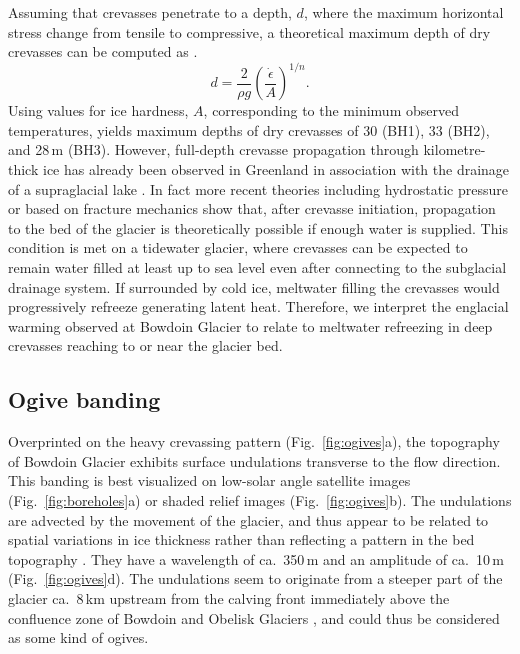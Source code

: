 \documentclass[utf8]{article}
\begin{document}
    Assuming that crevasses penetrate to a depth, $d$, where the maximum
    horizontal stress change from tensile to compressive, a theoretical maximum
    depth of dry crevasses can be computed as \citep[p.~449]{Nye.1955,
    Cuffey.Paterson.2010}.
    \begin{equation}
        d=\frac{2}{\rho g}(\frac{\dot\epsilon}{A})^{1/n}.
    \end{equation}
    Using values for ice hardness, $A$, corresponding to the minimum observed
    temperatures, yields maximum depths of dry crevasses of 30 (BH1), 33 (BH2),
    and 28\,m (BH3). However, full-depth crevasse propagation through
    kilometre-thick ice has already been observed in Greenland in association
    with the drainage of a supraglacial
    lake \citep{Das.etal.2008}. In fact more recent theories including
    hydrostatic pressure \citep{Benn.etal.2007} or based on fracture
    mechanics \citep{Veen.2007} show that, after crevasse initiation,
    propagation to the bed of the glacier is theoretically possible if enough
    water is supplied. This condition is met on a tidewater glacier,
    where crevasses can be expected to remain water filled at least up to sea
    level even after connecting to the subglacial drainage system. If
    surrounded by cold ice, meltwater filling the crevasses would progressively
    refreeze generating latent heat. Therefore, we interpret the englacial
    warming observed at Bowdoin Glacier to relate to meltwater refreezing in
    deep crevasses reaching to or near the glacier bed.


\subsection{Ogive banding}

    Overprinted on the heavy crevassing pattern (Fig.~\ref{fig:ogives}a), the
    topography of Bowdoin Glacier exhibits surface undulations transverse to
    the flow direction. This banding is best visualized on low-solar angle
    satellite images (Fig.~\ref{fig:boreholes}a) or shaded relief images
    (Fig.~\ref{fig:ogives}b). The undulations are advected by the movement of
    the glacier, and thus appear to be related to spatial variations in
    ice thickness rather than reflecting a pattern in the bed topography
    \citep[Fig.~\ref{fig:ogives}c; Fig.~3 of][]{Tsutaki.etal.2016}. They have a
    wavelength of ca.~350\,m and an amplitude of ca.~10\,m
    (Fig.~\ref{fig:ogives}d). The undulations seem to originate from a
    steeper part of the glacier ca.~8\,km upstream from the calving front
    immediately above the confluence zone of Bowdoin and Obelisk Glaciers
    \citep[Fig.~\ref{fig:images}a; Fig.~3 of ][]{Tsutaki.etal.2016}, and
    could thus be considered as some kind of ogives.
\end{document}
